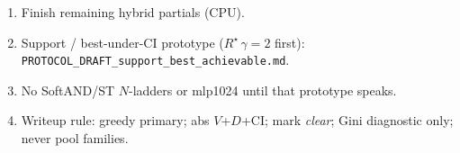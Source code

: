 \documentclass[11pt]{article}
\newcommand{\Rstar}{R^{\star}}
\newcommand{\clearwin}{\emph{clear}}
\begin{document}
\begin{enumerate}
  \item Finish remaining hybrid partials
        (CPU).
  \item Support / best-under-CI prototype
        (\(\Rstar\,\gamma{=}2\) first):
        \texttt{PROTOCOL\_DRAFT\_support\_best\_achievable.md}.
  \item No SoftAND/ST \(N\)-ladders or mlp1024
        until that prototype speaks.
  \item Writeup rule: greedy primary;
        abs \(V\)+\(D\)+CI; mark \clearwin;
        Gini diagnostic only; never pool
        families.
\end{enumerate}
\end{document}
